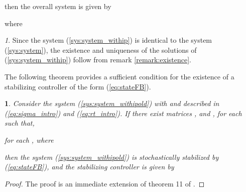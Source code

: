 \documentclass[10.5pt,a4paper]{article}
\theoremstyle{remark}
\theoremstyle{plain}
\newtheorem{thm}{\protect\theoremname}
\theoremstyle{plain}
\theoremstyle{remark}
\newtheorem{rem}{\protect\remarkname}
\theoremstyle{plain}
\theoremstyle{plain}
\providecommand{\remarkname}{Remark}
\providecommand{\theoremname}{Theorem}
\begin{document}
then the overall system is given by


where 

\begin{rem}Since the system (\ref{sys:system_withip}) is identical
to the system (\ref{sys:system}), the existence and uniqueness of the solutions
of (\ref{sys:system_withip}) follow from remark \ref{remark:existence}.\end{rem}

The following theorem provides a sufficient condition for the existence
of a stabilizing controller of the form (\ref{eq:stateFB}).

\begin{thm}\label{theorem:stabilization_SS} Consider the system
(\ref{sys:system_withipold}) with  and 
described in (\ref{eq:sigma_intro}) and (\ref{eq:rt_intro}). If
there exist matrices , and , for each 
such that, 

for each ,  where 

then the system (\ref{sys:system_withipold}) is stochastically stabilized
by (\ref{eq:stateFB}), and the stabilizing controller is given by

\end{thm} 
\begin{proof}
The proof is an immediate extension of theorem 11 of \cite{boukasbook}.
\end{proof}
\end{document}
